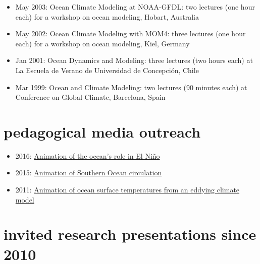 \documentclass{article}
\begin{document}
\begin{itemize}[leftmargin=*]
\item May 2003: {\sc Ocean Climate Modeling at NOAA-GFDL}: two lectures (one hour each) for a workshop on ocean modeling, Hobart, Australia

\item May 2002: {\sc Ocean Climate Modeling with MOM4}: three lectures (one hour each) for a workshop on ocean modeling, Kiel, Germany

\item Jan 2001: {\sc Ocean Dynamics and Modeling}: three lectures (two hours each) at La Escuela de Verano de Universidad de Concepci\'on, Chile

\item Mar 1999: {\sc Ocean and Climate Modeling}: two lectures (90 minutes each) at {\sc Conference on Global Climate}, Barcelona,
Spain

\end{itemize}



\section*{\sc  \color{Maroon} pedagogical media outreach}
\vspace{-.3cm}

\begin{itemize}[leftmargin=*]

\item 2016: \href{https://www.youtube.com/watch?v=gaFjlZxM7S4&feature=youtu.be}{Animation of  the ocean's role in El Ni\~{n}o} 

\item 2015:  \href{https://www.youtube.com/watch?v=8VMSF28J9H4&list=PL9poquLHLLO91iC_6pujn6bsMCvMyJ3xU}{Animation  of  Southern Ocean circulation} 

\item 2011:  \href{https://vimeo.com/27076776}{Animation  of  ocean surface temperatures from an eddying climate model} 

\end{itemize}



\section*{\sc \color{Maroon} invited research presentations since 2010}
\vspace{-.3cm}
\end{document}
